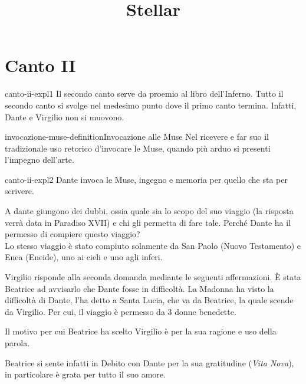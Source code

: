 \documentclass[preview]{standalone}
\begin{document}
\title{Stellar}
\genpage

\section{Canto II}

\begin{snippet}{canto-ii-expl1}
    Il secondo canto serve da proemio al libro dell'Inferno.
    Tutto il secondo canto si svolge nel medesimo punto dove il primo canto termina.
    Infatti, Dante e Virgilio non si muovono.
\end{snippet}

\begin{snippetdefinition}{invocazione-muse-definition}{Invocazione alle Muse}
    Nel ricevere e far suo il tradizionale uso retorico d'invocare le Muse, quando più arduo si presenti l'impegno dell'arte.
\end{snippetdefinition}

\begin{snippet}{canto-ii-expl2}
    Dante invoca le Muse, ingegno e memoria per quello che sta per scrivere.

    A dante giungono dei dubbi, ossia quale sia lo scopo del suo viaggio
    (la risposta verrà data in Paradiso XVII) e chi gli permetta di fare tale.
    Perché Dante ha il permesso di compiere questo viaggio?
    \\
    Lo stesso viaggio è stato compiuto solamente da San Paolo (Nuovo Testamento)
    e Enea (Eneide), uno ai cieli e uno agli inferi.
    
    Virgilio risponde alla seconda domanda mediante le seguenti affermazioni.
    È stata Beatrice ad avvisarlo che Dante fosse in difficoltà.
    La Madonna ha visto la difficoltà di Dante, l'ha detto a Santa Lucia, che va da Beatrice,
    la quale scende da Virgilio.
    Per cui, il viaggio è permesso da 3 donne benedette.
    \begin{center}
    \end{center}
    Il motivo per cui Beatrice ha scelto Virgilio è per la sua ragione e uso della parola.
    
    Beatrice si sente infatti in Debito con Dante per la sua gratitudine (\textit{Vita Nova}),
    in particolare è grata per tutto il suo amore.
\end{snippet}
\end{document}
